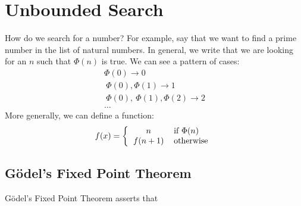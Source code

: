 \section{Unbounded Search}
How do we search for a number? For example, say that we want to find a prime number in the list of natural numbers. In general, we write that we are looking for an $n$ such that $\Phi(n)$ is true. We can see a pattern of cases:
\begin{eqnarray*}
  \Phi(0) \rightarrow 0\\
  ~\Phi(0), \Phi(1) \rightarrow 1\\
  ~\Phi(0), ~\Phi(1), \Phi(2) \rightarrow 2\\
  \ldots
\end{eqnarray*}
More generally, we can define a function:
\begin{equation*}
  f(x) = \left\{
  \begin{tabular}{c l}
    $n$ & if $\Phi(n)$\\
    $f(n + 1)$ & otherwise\\
  \end{tabular}
  \right.
\end{equation*}

\subsection{G\"odel's Fixed Point Theorem}
G\"odel's Fixed Point Theorem asserts that 

